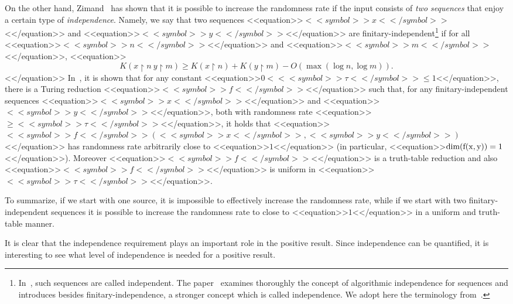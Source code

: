 \documentclass[proceedings]{stacs}
\newcommand{\rest}{{\upharpoonright}}
\newcommand{\dimm}{\rm dim}
\begin{document}
On the other hand, Zimand~\cite{zim:c:csr} has shown that it is possible to increase the randomness rate if the input consists of \emph{two sequences} that enjoy a certain type of \emph{independence}.   
Namely, we say that two sequences <<equation>>$<<symbol>>x<</symbol>>$<</equation>> and <<equation>>$<<symbol>>y<</symbol>>$<</equation>> are finitary-independent\footnote{In~\cite{zim:c:csr}, such sequences are called independent. The paper~\cite{cal-zim:c:dlt08} examines thoroughly the concept of algorithmic independence for sequences and introduces besides finitary-independence, a stronger concept which is called independence. We adopt here the terminology from~\cite{cal-zim:c:dlt08}.}  if for all <<equation>>$<<symbol>>n<</symbol>>$<</equation>> and <<equation>>$<<symbol>>m<</symbol>>$<</equation>>, 
<<equation>>\begin{equation}
\label{e:fin-indep}
K(x \rest n ~y \rest m) \geq K(x \rest n) + K(y \rest m) - O(\max (\log n, \log m)).
\end{equation}<</equation>>
In~\cite{zim:c:csr}, it is shown that for any constant <<equation>>$0 < <<symbol>>\tau <</symbol>>\leq 1$<</equation>>, there is a Turing reduction <<equation>>$<<symbol>>f<</symbol>>$<</equation>> such that, for any finitary-independent sequences <<equation>>$<<symbol>>x<</symbol>>$<</equation>> and <<equation>>$<<symbol>>y<</symbol>>$<</equation>>, both with randomness rate <<equation>>$\geq <<symbol>>\tau<</symbol>>$<</equation>>, it holds that <<equation>>$<<symbol>>f<</symbol>>(<<symbol>>x<</symbol>>,<<symbol>>y<</symbol>>)$<</equation>> has randomness rate arbitrarily close to <<equation>>$1$<</equation>> (in particular, <<equation>>$\dimm(f(x,y)) = 1$<</equation>>). Moreover <<equation>>$<<symbol>>f<</symbol>>$<</equation>> is a truth-table reduction and also <<equation>>$<<symbol>>f<</symbol>>$<</equation>> is uniform in <<equation>>$<<symbol>>\tau<</symbol>>$<</equation>>.

To summarize, if we start with one source, it is impossible to effectively increase the randomness rate, while if we start with two finitary-independent sequences it is possible to increase the randomness rate to close to <<equation>>$1$<</equation>> in a uniform and truth-table manner.

It is clear that the independence requirement plays an important role in the positive result. Since independence can be quantified, it is interesting to see what level of independence is needed for a positive result.
\end{document}
